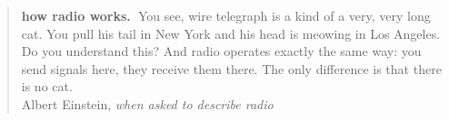 \vspace{2\baselineskip}

\begin{quote}
\textbf{how radio works.\ }You see, wire telegraph is a kind of a very, very long cat. You pull his tail in New York and his head is meowing in Los Angeles. Do you understand this? And radio operates exactly the same way: you send signals here, they receive them there. The only difference is that there is no cat. \\[0.5\baselineskip]
\hspace*{\fill} Albert Einstein, \emph{when asked to describe radio}
\end{quote}

\vspace*{\fill}

\cleardoublepage

\pagestyle{plain} %

\tableofcontents
\setlength{\unitlength}{1pt}
\clearpage
\listoffigures
\clearpage
\listoftables
\clearpage




\endinput
